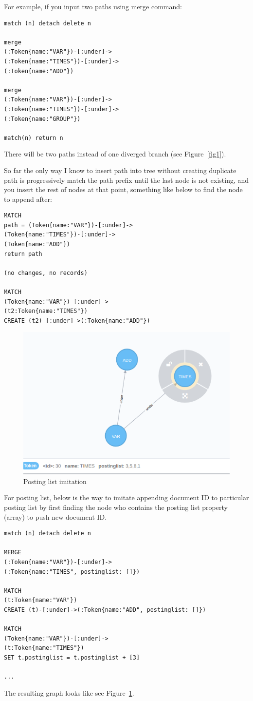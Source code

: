 \documentclass[a4paper]{article}
\begin{document}
For example, if you input two paths using merge command:
\begin{verbatim}
match (n) detach delete n

merge
(:Token{name:"VAR"})-[:under]->
(:Token{name:"TIMES"})-[:under]->
(:Token{name:"ADD"})

merge
(:Token{name:"VAR"})-[:under]->
(:Token{name:"TIMES"})-[:under]->
(:Token{name:"GROUP"})

match(n) return n
\end{verbatim}
There will be two paths instead of one diverged branch (see Figure~\ref{fig1}).

So far the only way I know to insert path into tree without creating duplicate path is progressively match the path prefix until the last node is not existing, and you insert the rest of nodes at that point, something like below to find the node to append after:
\begin{verbatim}
MATCH
path = (Token{name:"VAR"})-[:under]->
(Token{name:"TIMES"})-[:under]->
(Token{name:"ADD"})
return path

(no changes, no records)

MATCH
(Token{name:"VAR"})-[:under]->
(t2:Token{name:"TIMES"})
CREATE (t2)-[:under]->(:Token{name:"ADD"})
\end{verbatim}

\begin{figure}
\centering
\includegraphics[width=1.0\textwidth]{fig2.png}
\caption{\label{fig2}Posting list imitation}
\end{figure}

For posting list, below is the way to imitate appending document ID to particular posting list by first finding the node who contains the posting list property (array) to push new document ID.
\begin{verbatim}
match (n) detach delete n

MERGE
(:Token{name:"VAR"})-[:under]->
(:Token{name:"TIMES", postinglist: []})

MATCH
(t:Token{name:"VAR"})
CREATE (t)-[:under]->(:Token{name:"ADD", postinglist: []})

MATCH
(Token{name:"VAR"})-[:under]->
(t:Token{name:"TIMES"})
SET t.postinglist = t.postinglist + [3]

...
\end{verbatim}
The resulting graph looks like see Figure~\ref{fig2}.
\end{document}
